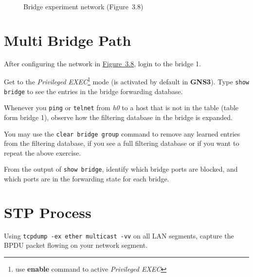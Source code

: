 \documentclass{../UTNetLab}
\begin{document}
\begin{figure}[H]
        \caption{Bridge experiment network (Figure~3.8)}\label{fig:3.8}
    \end{figure}

\section{Multi Bridge Path}
    After configuring the network in \hyperref[fig:3.8]{Figure~3.8}, login to the bridge 1.

    Get to the \textit{Privileged EXEC}\footnote{use \textbf{enable} command to active \textit{Privileged EXEC}} mode (is activated by default in \textbf{GNS3}).
    Type \lstinline[language={cisco}]{show bridge} to see the entries in the bridge forwarding database.

    Whenever you \lstinline{ping} or \lstinline{telnet} from \textit{h0} to a host that is not in the table (table form bridge 1), observe how the filtering database in the bridge is expanded.

    You may use the \lstinline[language={cisco}, emph={group}]{clear bridge group} command to remove any learned entries from the filtering database, if you see a full filtering database or if you want to repeat the above exercise.

    \begin{report}
        \item From the output of \lstinline[language={cisco}]{show bridge}, identify which bridge ports are blocked, and which ports are in the forwarding state for each bridge.
    \end{report}

\section{STP Process}
    Using \lstinline{tcpdump -ex ether multicast -vv} on all LAN segments, capture the BPDU packet flowing on your network segment.
\end{document}
